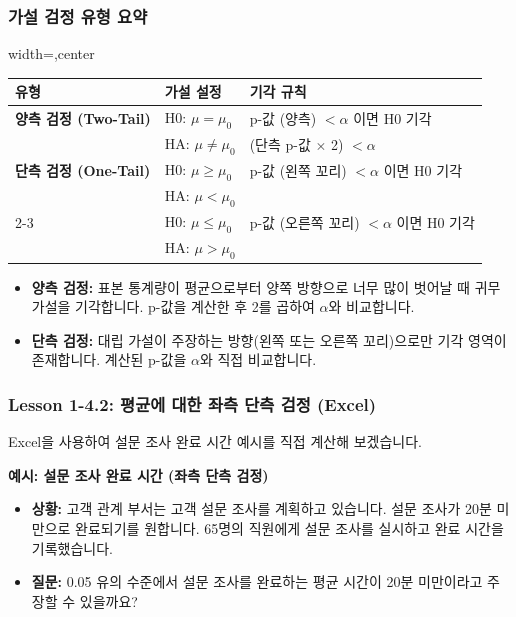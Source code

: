 \documentclass[11pt,a4paper]{article}
\begin{document}
\subsubsection*{가설 검정 유형 요약}

\begin{adjustbox}{width=\textwidth,center}
\begin{tabular}{lll}
\toprule
\textbf{유형} & \textbf{가설 설정} & \textbf{기각 규칙} \\
\midrule
\textbf{양측 검정 (Two-Tail)} & H0: $\mu = \mu_0$ & p-값 (양측) $< \alpha$ 이면 H0 기각 \\
& HA: $\mu \ne \mu_0$ & (단측 p-값 $\times$ 2) $< \alpha$ \\
\midrule
\textbf{단측 검정 (One-Tail)} & H0: $\mu \ge \mu_0$ & p-값 (왼쪽 꼬리) $< \alpha$ 이면 H0 기각 \\
& HA: $\mu < \mu_0$ & \\
\cmidrule{2-3}
& H0: $\mu \le \mu_0$ & p-값 (오른쪽 꼬리) $< \alpha$ 이면 H0 기각 \\
& HA: $\mu > \mu_0$ & \\
\bottomrule
\end{tabular}
\end{adjustbox}
\label{tab:hypothesis_summary}

\begin{itemize}
    \item \textbf{양측 검정:} 표본 통계량이 평균으로부터 양쪽 방향으로 너무 많이 벗어날 때 귀무 가설을 기각합니다. p-값을 계산한 후 2를 곱하여 $\alpha$와 비교합니다.
    \item \textbf{단측 검정:} 대립 가설이 주장하는 방향(왼쪽 또는 오른쪽 꼬리)으로만 기각 영역이 존재합니다. 계산된 p-값을 $\alpha$와 직접 비교합니다.
\end{itemize}

\newpage
\subsubsection{Lesson 1-4.2: 평균에 대한 좌측 단측 검정 (Excel)}

Excel을 사용하여 설문 조사 완료 시간 예시를 직접 계산해 보겠습니다.

\begin{examplebox}
\textbf{예시: 설문 조사 완료 시간 (좌측 단측 검정)}
\begin{itemize}
    \item \textbf{상황:} 고객 관계 부서는 고객 설문 조사를 계획하고 있습니다. 설문 조사가 20분 미만으로 완료되기를 원합니다. 65명의 직원에게 설문 조사를 실시하고 완료 시간을 기록했습니다.
    \item \textbf{질문:} 0.05 유의 수준에서 설문 조사를 완료하는 평균 시간이 20분 미만이라고 주장할 수 있을까요?
\end{itemize}
\end{examplebox}
\end{document}
